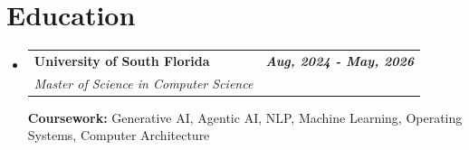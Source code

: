 \documentclass[letterpaper,10pt]{article}
\makeatletter
\newcommand{\resumeSubheading}[4]{
  \vspace{-3pt}\item[]
    \begin{tabular*}{0.97\textwidth}[t]{l@{\extracolsep{\fill}}r}
      \textbf{#1} & \textbf{#2} \\
      \textit{\small#3} & \textit{\small #4} \\
    \end{tabular*}\vspace{-6pt}
}
\newcommand{\resumeSubHeadingListStart}{\begin{itemize}[leftmargin=*]}
\newcommand{\resumeSubHeadingListEnd}{\end{itemize}\vspace{-6pt}}
\makeatother
\begin{document}
\section*{Education}
\resumeSubHeadingListStart

  \resumeSubheading
    {University of South Florida}{\textit{Aug, 2024 - May, 2026}}
    {Master of Science in Computer Science}{}

    \textbf{Coursework:} Generative AI, Agentic AI, NLP, Machine Learning, Operating Systems, Computer Architecture

\resumeSubHeadingListEnd
\end{document}

